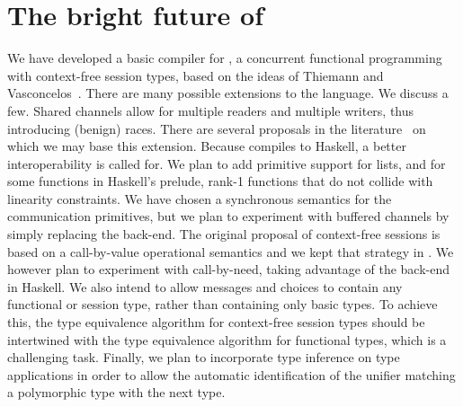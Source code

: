 \section{The bright future of \freest{}}
\label{sec:conclusion}

We have developed a basic compiler for \freest, a concurrent
functional programming with context-free session types, based on the
ideas of Thiemann and Vasconcelos~\cite{DBLP:conf/icfp/ThiemannV16}.
%
There are many possible extensions to the language. We discuss a
few. Shared channels allow for multiple readers and multiple writers,
thus introducing (benign) races. There are several proposals in the
literature~\cite{DBLP:journals/pacmpl/BalzerP17,
  DBLP:conf/sefm/FrancoV13,Lindley.Morris_Lightweight.functional.session.types,DBLP:journals/iandc/Vasconcelos12}
on which we may base this extension.
%
Because \freest{} compiles to Haskell, a better interoperability is
called for. We plan to add primitive support for lists, and for some
functions in Haskell's prelude, rank-1 functions that do not collide
with linearity constraints.
%
We have chosen a synchronous semantics for the communication
primitives, but we plan to experiment with buffered channels by simply
replacing the back-end.
%
The original proposal of context-free sessions is based on a
call-by-value operational semantics and we kept that strategy in
\freest. We however plan to experiment with call-by-need, taking
advantage of the back-end in Haskell. We also intend to allow messages
and choices to contain any functional or session type, rather than
containing only basic types. To achieve this,
the type equivalence algorithm for context-free session 
types should be intertwined with the type equivalence
algorithm for functional types, which is a challenging task.
Finally, we plan to incorporate type inference on type 
applications in order to allow the automatic identification of the
unifier matching a polymorphic type with the next type.

